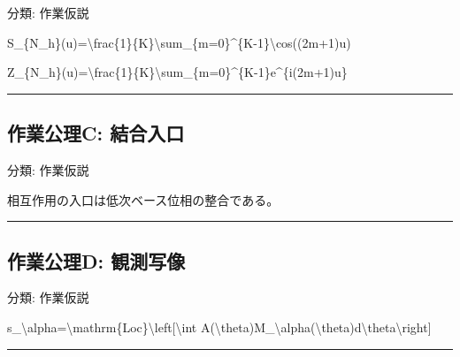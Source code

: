 \documentclass[
  a4paper,
]{ltjsarticle}
\newenvironment{Shaded}{}{}
\newcommand{\NormalTok}[1]{#1}
\begin{document}
分類: 作業仮説

\begin{Shaded}
\begin{Highlighting}[]
\NormalTok{S\_\{N\_h\}(u)=\textbackslash{}frac\{1\}\{K\}\textbackslash{}sum\_\{m=0\}\^{}\{K{-}1\}\textbackslash{}cos((2m+1)u)}
\end{Highlighting}
\end{Shaded}

\begin{Shaded}
\begin{Highlighting}[]
\NormalTok{Z\_\{N\_h\}(u)=\textbackslash{}frac\{1\}\{K\}\textbackslash{}sum\_\{m=0\}\^{}\{K{-}1\}e\^{}\{i(2m+1)u\}}
\end{Highlighting}
\end{Shaded}

\begin{center}\rule{0.5\linewidth}{0.5pt}\end{center}

\subsection{作業公理C:
結合入口}\label{ux4f5cux696dux516cux7406c-ux7d50ux5408ux5165ux53e3}

分類: 作業仮説

相互作用の入口は低次ベース位相の整合である。

\begin{center}\rule{0.5\linewidth}{0.5pt}\end{center}

\subsection{作業公理D:
観測写像}\label{ux4f5cux696dux516cux7406d-ux89b3ux6e2cux5199ux50cf}

分類: 作業仮説

\begin{Shaded}
\begin{Highlighting}[]
\NormalTok{s\_\textbackslash{}alpha=\textbackslash{}mathrm\{Loc\}\textbackslash{}left[\textbackslash{}int A(\textbackslash{}theta)M\_\textbackslash{}alpha(\textbackslash{}theta)d\textbackslash{}theta\textbackslash{}right]}
\end{Highlighting}
\end{Shaded}

\begin{center}\rule{0.5\linewidth}{0.5pt}\end{center}
\end{document}
